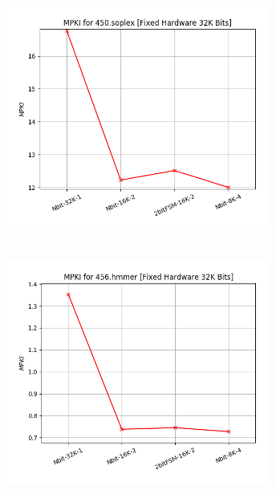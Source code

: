    \begin{minipage}{\textwidth}
      \begin{center}
         \\
         \vspace{3mm}
         \includegraphics[width=0.65\textwidth, frame]{./graphs/4-2ii/450-soplex.png}
         \vspace{6mm}
      \end{center}
   \end{minipage}

   \begin{minipage}{\textwidth}
      \begin{center}
         \\
         \vspace{3mm}
         \includegraphics[width=0.65\textwidth, frame]{./graphs/4-2ii/456-hmmer.png}
         \vspace{6mm}
      \end{center}
   \end{minipage}

